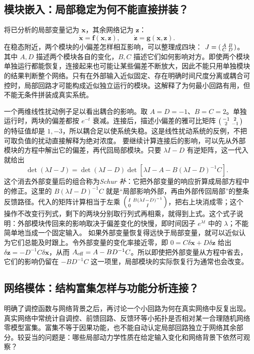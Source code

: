 \documentclass[11pt,a4paper,UTF8,fontset=fandol]{ctexart}
\begin{document}
\subsection{模块嵌入：局部稳定为何不能直接拼装？}
将已分析的局部变量记为 $\bm x$，其余网络记为 $\bm z$：
\begin{equation}\dot{\bm x}=\bm f(\bm x,\bm z),\qquad\dot{\bm z}=\bm g(\bm x,\bm z).\end{equation}
在稳态附近，两个模块的小偏差怎样相互影响，可以整理成四块： $J=\begin{psmallmatrix}A&B\\C&D\end{psmallmatrix}$。其中 $A,D$ 描述两个模块各自的变化，$B,C$ 描述它们如何影响对方。即使两个模块单独运行都能恢复，连接起来也可能让某些偏差不断放大，因此不能只用单独模块的结果判断整个网络。只有在外部输入近似固定、存在明确时间尺度分离或耦合可控时，局部回路才可能构成近似独立运行的模块。这解释了为何最小回路有用，但不能无条件拼装成真实系统。

一个两维线性扰动例子足以看出耦合的影响。取 $A=D=-1$、$B=C=2$。单独运行时，两块的偏差都按 $e^{-t}$ 衰减。连接后，描述小偏差的雅可比矩阵
$\begin{psmallmatrix}-1&2\\2&-1\end{psmallmatrix}$ 的特征值却是 $1,-3$，所以耦合足以使系统失稳。这是线性扰动系统的反例，不把可取负值的扰动直接解释为绝对浓度。
要继续计算连接后的影响，可以先从外部模块的方程中解出它的偏差，再代回局部模块。只要 $\lambda I-D$ 有逆矩阵，这一代入就给出
\[
\det(\lambda I-J)=\det(\lambda I-D)
\det\left[\lambda I-A-B(\lambda I-D)^{-1}C\right].
\]
这个消去外部变量后的组合称为\emph{Schur 补}：它把外部变量的响应折算成局部方程中的修正。这里的 $B(\lambda I-D)^{-1}C$ 就是“局部影响外部，再由外部传回局部”的整条反馈路径。代入的矩阵计算相当于左乘 $\begin{psmallmatrix}I&B(\lambda I-D)^{-1}\\0&I\end{psmallmatrix}$，把右上块消成零；这个操作不改变行列式，剩下的两块分别取行列式再相乘，就得到上式。这个式子说明：外部模块传回来的影响取决于偏差变化的快慢，即时间因子 $e^{\lambda t}$ 中的 $\lambda$；不能简单地当成一个固定输入。
如果外部变量恢复得远快于局部变量，就可以近似认为它们总能及时跟上。令外部变量的变化率接近零，即 $0=C\delta\bm x+D\delta\bm z$ 给出 $\delta\bm z=-D^{-1}C\delta\bm x$，从而 $A_{\rm eff}=A-BD^{-1}C$。所以即使把外部变量从方程中省去，它们的影响仍留在 $-BD^{-1}C$ 这一项里，局部模块的实际恢复行为通常也会改变。

\subsection{网络模体：结构富集怎样与功能分析连接？}
明确了调控函数与网络背景之后，再讨论一个小回路为何在真实网络中反复出现。
真实网络中常统计自调控、前馈回路、反馈环等小拓扑是否相对某一合理随机网络零模型富集。富集不等于因果功能，也不能自动认定局部回路独立于网络其余部分。较妥当的问题是：哪些局部动力学性质在给定输入变化和网络背景下依然可观察？
\end{document}
